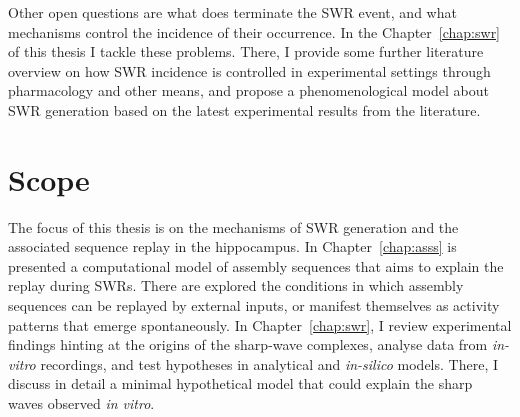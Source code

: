 
    Other open questions are what does terminate the SWR event, and what
    mechanisms control the incidence of their occurrence. In the
    Chapter~\ref{chap:swr} of this thesis I tackle these problems. There, I
    provide some further literature overview on how SWR incidence is controlled
    in experimental settings through pharmacology and other means, and propose
    a phenomenological model about SWR generation based on the latest
    experimental results from the literature.

\section{Scope}
  The focus of this thesis is on the mechanisms of SWR generation and the
  associated sequence replay in the hippocampus. In Chapter~\ref{chap:asss} is
  presented a computational model of assembly sequences that aims to explain the
  replay during SWRs. There are explored the conditions in which assembly sequences
  can be replayed by external inputs, or manifest themselves as activity
  patterns that emerge spontaneously. In Chapter~\ref{chap:swr}, I review
  experimental findings hinting at the origins of the sharp-wave complexes,
  analyse data from \textit{in-vitro} recordings, and test hypotheses in
  analytical and \textit{in-silico} models. There, I discuss in detail a
  minimal hypothetical model that could explain the sharp waves observed
  \textit{in vitro}. 
  
  \begin{comment}
\section{tao}
  BE/AE :ise/ize; behaviour/ behavior
  -rho have/ has shown -> rho showed? 
  \end{comment}


